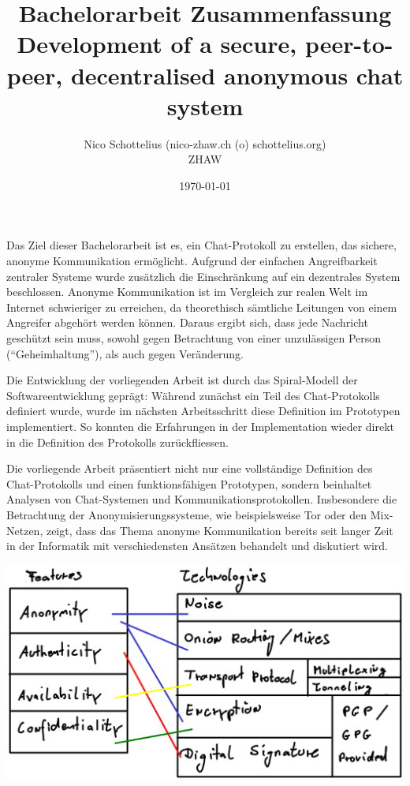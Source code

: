 \documentclass[9pt,a4paper]{article}
\begin{document}
\title{Bachelorarbeit Zusammenfassung\\
Development of a secure, peer-to-peer, decentralised
anonymous chat system}
\date{\today}
\author{Nico Schottelius (nico-zhaw.ch (o) schottelius.org)\\ZHAW}
\maketitle
Das Ziel dieser Bachelorarbeit ist es, ein Chat-Protokoll zu erstellen,
das sichere, anonyme Kommunikation ermöglicht. Aufgrund der einfachen
Angreifbarkeit zentraler Systeme wurde zusätzlich die Einschränkung
auf ein dezentrales System beschlossen. Anonyme Kommunikation ist im Vergleich
zur realen Welt im Internet schwieriger zu erreichen, da theorethisch
sämtliche Leitungen von einem Angreifer abgehört werden können. Daraus ergibt
sich, dass jede Nachricht geschützt sein muss, sowohl
gegen Betrachtung von einer
unzulässigen Person ("`Geheimhaltung"'), als auch gegen Veränderung.

Die Entwicklung der vorliegenden Arbeit ist durch das Spiral-Modell der 
Softwareentwicklung geprägt: Während zunächst ein Teil
des Chat-Protokolls definiert wurde, wurde im nächsten Arbeitsschritt 
diese Definition im Prototypen implementiert.
So konnten die Erfahrungen in der Implementation wieder direkt in die Definition
des Protokolls zurückfliessen.

Die vorliegende Arbeit präsentiert nicht nur eine vollständige
Definition des Chat-Protokolls und einen funktionsfähigen Prototypen, sondern
beinhaltet Analysen von Chat-Systemen und Kommunikationsprotokollen.
Insbesondere die Betrachtung der Anonymisierungssysteme, wie beispielsweise Tor
oder den Mix-Netzen, zeigt, dass das Thema anonyme Kommunikation bereits
seit langer Zeit in der Informatik mit verschiedensten Ansätzen behandelt
und diskutiert wird.

\includegraphics[scale=0.8]{features-technologies.eps}
\end{document}
